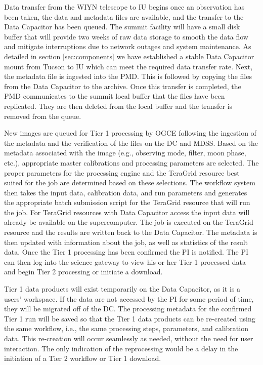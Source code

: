\documentclass[10pt,conference]{IEEEtran}
\begin{document}
Data transfer from the WIYN telescope to IU begins once an observation has been taken, the data and metadata files are available, and the transfer to the Data Capacitor has been queued. 
The summit facility will have a small disk buffer that will provide two weeks of raw data storage to smooth the data flow and mitigate interruptions due to network outages and system maintenance. As detailed in section \ref{sec:components} we have established a stable Data Capacitor mount from Tucson to IU which can meet the required data transfer rate. Next, the metadata file is ingested into the PMD. This is followed by copying the files from the Data Capacitor to the archive. Once this transfer is completed, the PMD communicates to the summit local buffer that the files have been replicated. They are then deleted from the local buffer and the transfer is removed from the queue.

New images are queued for Tier 1 processing by OGCE following the ingestion of the metadata and the verification of the files on the DC and MDSS. 
Based on the metadata associated with the image (e.g., observing mode, filter, moon phase, etc.), appropriate master calibrations and processing parameters are selected. The proper parameters for the processing engine and the TeraGrid resource best suited for the job are determined based on these selections. The workflow system then takes the input data, calibration data, and run parameters and generates the appropriate batch submission script for the TeraGrid resource that will run the job. For TeraGrid resources with Data Capacitor access the input data will already be available on the supercomputer. The job is executed on the TeraGrid resource and the results are written back to the Data Capacitor. The metadata is then updated with information about the job, as well as statistics of the result data. Once the Tier 1 processing has been confirmed the PI is notified. The PI can then log into the science gateway to view his or her Tier 1 processed data and begin Tier 2 processing or initiate a download.

Tier 1 data products will exist temporarily on the Data Capacitor, as it is a users' workspace. If the data are not accessed by the PI for some period of time, they will be migrated off of the DC. The processing metadata for the confirmed Tier 1 run will be saved so that the Tier 1 data products can be re-created using the same workflow, i.e., the same processing steps, parameters, and calibration data. This re-creation will occur seamlessly as needed, without the need for user interaction. The only indication of the reprocessing would be a delay in the initiation of a Tier 2 workflow or Tier 1 download.
\end{document}
